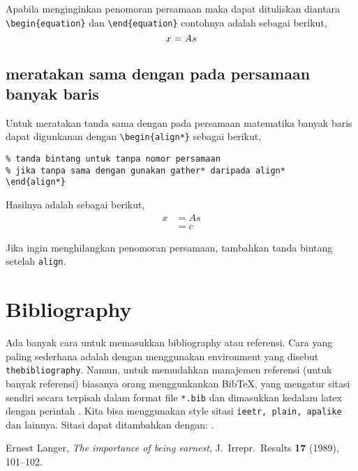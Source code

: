 \documentclass[12pt]{article}
\begin{document}
Apabila menginginkan penomoran persamaan maka dapat dituliskan diantara \verb|\begin{equation}| dan \verb|\end{equation}| contohnya adalah sebagai berikut,
\begin{equation}
$$ x = A s $$
\end{equation}

\subsection{meratakan sama dengan pada persamaan banyak baris}
Untuk meratakan tanda sama dengan pada persamaan matematika banyak baris dapat digunkanan dengan \verb|\begin{align*}| sebagai berikut,
\begin{verbatim}
% tanda bintang untuk tanpa nomor persamaan
% jika tanpa sama dengan gunakan gather* daripada align*
\end{align*}
\end{verbatim}
Hasilnya adalah sebagai berikut,
\begin{align} 
x &= A s\\  
  &= c
\end{align}

Jika ingin menghilangkan penomoran persamaan, tambahkan tanda bintang setelah \verb|align|.

\section{Bibliography}
Ada banyak cara untuk memasukkan bibliography atau referensi. Cara yang paling sederhana adalah dengan menggunakan environment yang disebut \texttt{thebibliography}.  Namun, untuk memudahkan manajemen referensi (untuk banyak referensi) biasanya orang menggunkankan BibTeX, yang mengatur sitasi sendiri secara terpisah dalam format file \texttt{*.bib} dan dimasukkan kedalam latex dengan perintah \verb||. 
Kita bisa menggunakan style sitasi \texttt{ieetr, plain, apalike} dan lainnya. Sitasi dapat ditambahkan dengan: \cite{langer1989}.

\begin{thebibliography}{9}

 Ernest Langer, \textit{The importance of being earnest}, J.\ Irrepr.\ Results \textbf{17} (1989), 101--102.

\end{thebibliography}
\end{document}
